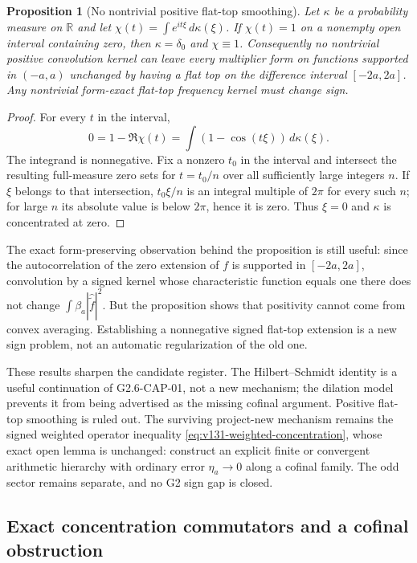 \documentclass[11pt]{article}
\newtheorem{proposition}[theorem]{Proposition}
\theoremstyle{remark}
\begin{document}
\begin{proposition}[No nontrivial positive flat-top smoothing]
\label{prop:v132-flat-top}
Let $\kappa$ be a probability measure on $\mathbb R$ and let
$\chi(t)=\int e^{it\xi}\,d\kappa(\xi)$. If $\chi(t)=1$ on a nonempty
open interval containing zero, then $\kappa=\delta_0$ and
$\chi\equiv1$. Consequently no nontrivial positive convolution kernel
can leave every multiplier form on functions supported in $(-a,a)$
unchanged by having a flat top on the difference interval $[-2a,2a]$.
Any nontrivial form-exact flat-top frequency kernel must change sign.
\end{proposition}
\begin{proof}
For every $t$ in the interval,
\[
 0=1-\Re\chi(t)=\int(1-\cos(t\xi))\,d\kappa(\xi).
\]
The integrand is nonnegative. Fix a nonzero $t_0$ in the interval and
intersect the resulting full-measure zero sets for $t=t_0/n$ over all
sufficiently large integers $n$. If $\xi$ belongs to that intersection,
$t_0\xi/n$ is an integral multiple of $2\pi$ for every such $n$; for
large $n$ its absolute value is below $2\pi$, hence it is zero. Thus
$\xi=0$ and $\kappa$ is concentrated at zero.
\end{proof}

The exact form-preserving observation behind the proposition is still
useful: since the autocorrelation of the zero extension of $f$ is
supported in $[-2a,2a]$, convolution by a signed kernel whose
characteristic function equals one there does not change
$\int\beta_a|\widehat{\widetilde f}|^2$. But the proposition shows
that positivity cannot come from convex averaging. Establishing a
nonnegative signed flat-top extension is a new sign problem, not an
automatic regularization of the old one.

These results sharpen the candidate register. The Hilbert--Schmidt
identity is a useful continuation of G2.6-CAP-01, not a new mechanism;
the dilation model prevents it from being advertised as the missing
cofinal argument. Positive flat-top smoothing is ruled out. The
surviving project-new mechanism remains the signed weighted operator
inequality \eqref{eq:v131-weighted-concentration}, whose exact open
lemma is unchanged: construct an explicit finite or convergent
arithmetic hierarchy with ordinary error $\eta_a\to0$ along a cofinal
family. The odd sector remains separate, and no G2 sign gap is closed.

\subsection{Exact concentration commutators and a cofinal obstruction}
\end{document}
